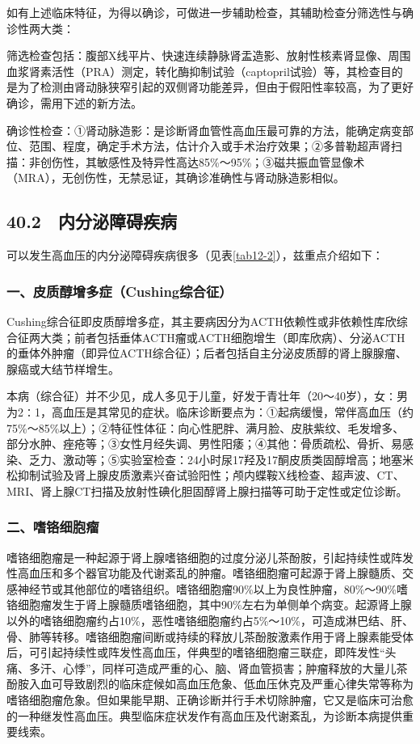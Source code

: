 如有上述临床特征，为得以确诊，可做进一步辅助检查，其辅助检查分筛选性与确诊性两大类：

筛选检查包括：腹部X线平片、快速连续静脉肾盂造影、放射性核素肾显像、周围血浆肾素活性（PRA）测定，转化酶抑制试验（captopril试验）等，其检查目的是为了检测由肾动脉狭窄引起的双侧肾功能差异，但由于假阳性率较高，为了更好确诊，需用下述的新方法。

确诊性检查：①肾动脉造影：是诊断肾血管性高血压最可靠的方法，能确定病变部位、范围、程度，确定手术方法，估计介入或手术治疗效果；②多普勒超声肾扫描：非创伤性，其敏感性及特异性高达85\%～95\%；③磁共振血管显像术（MRA），无创伤性，无禁忌证，其确诊准确性与肾动脉造影相似。

\protect\hypertarget{text00110.html}{}{}

\subsection{40.2　内分泌障碍疾病}

可以发生高血压的内分泌障碍疾病很多（见表\ref{tab12-2}），兹重点介绍如下：

\subsubsection{一、皮质醇增多症（Cushing综合征）}

Cushing综合征即皮质醇增多症，其主要病因分为ACTH依赖性或非依赖性库欣综合征两大类；前者包括垂体ACTH瘤或ACTH细胞增生（即库欣病）、分泌ACTH的垂体外肿瘤（即异位ACTH综合征）；后者包括自主分泌皮质醇的肾上腺腺瘤、腺癌或大结节样增生。

本病（综合征）并不少见，成人多见于儿童，好发于青壮年（20～40岁），女∶男为2∶1，高血压是其常见的症状。临床诊断要点为：①起病缓慢，常伴高血压（约75\%～85\%以上）；②特征性体征：向心性肥胖、满月脸、皮肤紫纹、毛发增多、部分水肿、痤疮等；③女性月经失调、男性阳痿；④其他：骨质疏松、骨折、易感染、乏力、激动等；⑤实验室检查：24小时尿17羟及17酮皮质类固醇增高；地塞米松抑制试验及肾上腺皮质激素兴奋试验阳性；颅内蝶鞍X线检查、超声波、CT、MRI、肾上腺CT扫描及放射性碘化胆固醇肾上腺扫描等可助于定性或定位诊断。

\subsubsection{二、嗜铬细胞瘤}

嗜铬细胞瘤是一种起源于肾上腺嗜铬细胞的过度分泌儿茶酚胺，引起持续性或阵发性高血压和多个器官功能及代谢紊乱的肿瘤。嗜铬细胞瘤可起源于肾上腺髓质、交感神经节或其他部位的嗜铬组织。嗜铬细胞瘤90\%以上为良性肿瘤，80\%～90\%嗜铬细胞瘤发生于肾上腺髓质嗜铬细胞，其中90\%左右为单侧单个病变。起源肾上腺以外的嗜铬细胞瘤约占10\%，恶性嗜铬细胞瘤约占5\%～10\%，可造成淋巴结、肝、骨、肺等转移。嗜铬细胞瘤间断或持续的释放儿茶酚胺激素作用于肾上腺素能受体后，可引起持续性或阵发性高血压，伴典型的嗜铬细胞瘤三联症，即阵发性“头痛、多汗、心悸”，同样可造成严重的心、脑、肾血管损害；肿瘤释放的大量儿茶酚胺入血可导致剧烈的临床症候如高血压危象、低血压休克及严重心律失常等称为嗜铬细胞瘤危象。但如果能早期、正确诊断并行手术切除肿瘤，它又是临床可治愈的一种继发性高血压。典型临床症状发作有高血压及代谢紊乱，为诊断本病提供重要线索。


